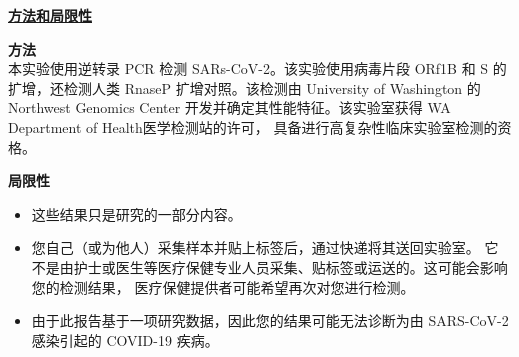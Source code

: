 \documentclass[10pt]{article}
\begin{document}
\large \underline{\textbf{方法和局限性}}

\textbf{方法}\\
本实验使用逆转录 PCR 检测 SARs-CoV-2。该实验使用病毒片段 ORf1B 和 S 的扩增，还检测人类
RnaseP 扩增对照。该检测由 University of Washington 的 Northwest Genomics Center
开发并确定其性能特征。该实验室获得 WA Department of Health医学检测站的许可，
具备进行高复杂性临床实验室检测的资格。

\textbf{局限性}

\begin{itemize}

\item

  这些结果只是研究的一部分内容。

\item

  您自己（或为他人）采集样本并贴上标签后，通过快递将其送回实验室。
  它不是由护士或医生等医疗保健专业人员采集、贴标签或运送的。这可能会影响您的检测结果，
  医疗保健提供者可能希望再次对您进行检测。

\item

  由于此报告基于一项研究数据，因此您的结果可能无法诊断为由 SARS-CoV-2 感染引起的 COVID-19
  疾病。

\end{itemize}
\end{document}
